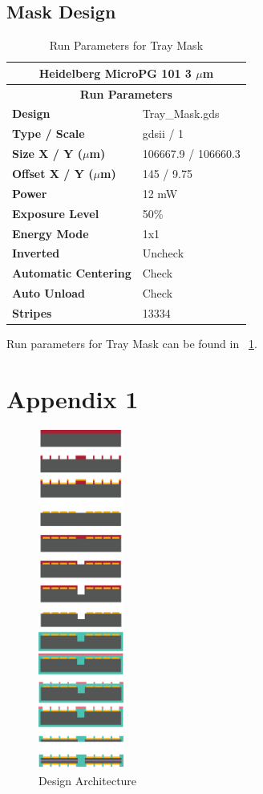\documentclass[12pt]{article}
\numberwithin{equation}{section}
\numberwithin{table}{section}
\numberwithin{figure}{section}
\begin{document}
\subsection{Mask Design}


\begin{table}[]
\centering
\caption{Run Parameters for Tray Mask}
\label{TM}
\begin{tabular}{@{}ll@{}}
\toprule
\multicolumn{2}{c}{\textbf{Heidelberg MicroPG 101 3 $\mu$m}} \\ \midrule
\multicolumn{2}{c}{\textbf{Run Parameters}} \\
\textbf{Design} & Tray\_Mask.gds \\
\textbf{Type / Scale} & gdsii / 1 \\
\textbf{Size X / Y ($\mu$m)} & 106667.9 / 106660.3 \\
\textbf{Offset X / Y ($\mu$m)} & 145 / 9.75 \\
\textbf{Power} & 12 mW \\
\textbf{Exposure Level} & 50\% \\
\textbf{Energy Mode} & 1x1 \\
\textbf{Inverted} & Uncheck \\
\textbf{Automatic Centering} & Check \\
\textbf{Auto Unload} & Check \\
\textbf{Stripes} & 13334 \\ \bottomrule
\end{tabular}
\end{table}

Run parameters for Tray Mask can be found in ~\ref{TM}.

 
\appendix

\section{Appendix 1} 
\label{appendix_1}

\begin{figure} \centering
  \includegraphics[width=0.25\textwidth]{DesignArchitecture.png}
  \caption{Design Architecture}
  \label{DesignArchitecture}
\end{figure}




\end{document}
